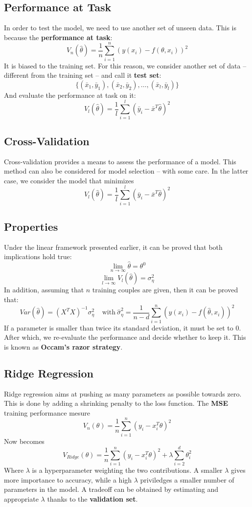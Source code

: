 \documentclass{article}
\begin{document}
\subsection{Performance at Task}
In order to test the model, we need to use another set of unseen data. This is because the \textbf{performance at task}:
\[ V_n(\hat\theta) = \frac{1}{n} \sum^n_{i=1}(y(x_i) - f(\theta, x_i))^2 \]
It is biased to the training set. For this reason, we consider another set of data -- different from the training set -- and call it \textbf{test set}:
\[ \{ (\bar x_1, \bar y_1), (\bar x_2, \bar y_2), \dots, (\bar x_l, \bar y_l) \} \]
And evaluate the performance at task on it:
\[ V_l(\hat\theta) = \frac{1}{l} \sum^l_{i=1}(\bar y_i - \bar x^T\hat\theta)^2 \]

\subsection{Cross-Validation}
Cross-validation provides a means to assess the performance of a model. This method can also be considered for model selection -- with some care. In the latter case, we consider the model that minimizes
\[ V_l(\hat\theta) = \frac{1}{l} \sum^l_{i=1}(\bar y_i - \bar x^T\hat\theta)^2 \]

\subsection{Properties}
Under the linear framework presented earlier, it can be proved that both implications hold true:
\[ \lim_{n \rightarrow \infty} \hat\theta = \theta^0 \]
\[ \lim_{l \rightarrow \infty} V_l(\hat\theta) = \sigma^2_\eta \]
In addition, assuming that $n$ training couples are given, then it can be proved that:
\[ Var(\hat\theta) = (X^TX)^{-1}\sigma^2_\eta ~~~~~ \text{with}~\hat\sigma^2_\eta = \frac{1}{n - d} \sum^n_{i = 1}(y(x_i) - f(\hat\theta, x_i))^2 \]
If a parameter is smaller than twice its standard deviation, it must be set to 0. After which, we re-evaluate the performance and decide whether to keep it. This is known as \textbf{Occam's razor strategy}.

\subsection{Ridge Regression}
Ridge regression aims at pushing as many parameters as possible towards zero. This is done by adding a shrinking penalty to the loss function. The \textbf{MSE} training performance mesure
\[ V_n(\theta) = \frac{1}{n} \sum^n_{i=1}(y_i - x_i^T\theta)^2 \]
Now becomes
\[ V_{Ridge}(\theta) = \frac{1}{n} \sum^n_{i=1}(y_i - x_i^T\theta)^2 + \lambda \sum^d_{i=2}\theta^2_i \]
Where $\lambda$ is a hyperparameter weighting the two contributions. A smaller $\lambda$ gives more importance to accuracy, while a high $\lambda$ priviledges a smaller number of parameters in the model. A tradeoff can be obtained by estimating and appropriate $\lambda$ thanks to the \textbf{validation set}.
\end{document}
